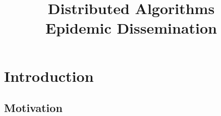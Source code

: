 
\title[DS - Epidemic Dissemination]{\textbf{Distributed Algorithms}\\Epidemic Dissemination}

\graphicspath{{figs/05/}}



\newcommand{\Value}{\mathit{value}}
\newcommand{\Time}{\fontvar{time}}
\newcommand{\Now}{\fontproc{now}}
\newcommand{\Random}{\fontproc{random}}
\newcommand{\Update}{\textsc{update}\xspace}
\newcommand{\Push}{\textsc{push}\xspace}
\newcommand{\Pull}{\textsc{pull}\xspace}
\newcommand{\ReplyPull}{\textsc{reply}\xspace}
\newcommand{\PushPull}{\textsc{pushpull}\xspace}
\newcommand{\ReplyPushPull}{\textsc{reply}\xspace}


\FrameTitle{}
\FrameContent

\section{Introduction}

\subsection{Motivation}

